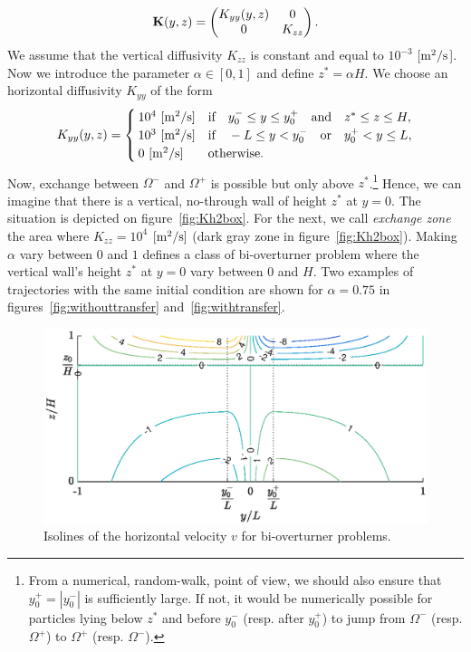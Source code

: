  \begin{equation}
 	\b K(y,z) = \begin{pmatrix} K_{yy}(y,z) & 0\\ 0 & K_{zz} \end{pmatrix}.  	
 \end{equation} 
We assume that the vertical diffusivity $K_{zz}$ is constant and equal to $10^{-3}$ [$\rm{m^2/s}$]. Now we introduce the parameter $\alpha \in [0,1]$ and define $z^* = \alpha H$. We choose an horizontal diffusivity $K_{yy}$ of the form
\begin{equation} \label{eq:Kh2box}
	K_{yy}(y,z) = \begin{cases}
			10^4\ \rm{[m^2/s]} & \mbox{if} \quad y_0^- \le y \le y_0^+ \quad \mbox{and} \quad z^* \le z \le H,\\
			10^3\ \rm{[m^2/s]} & \mbox{if} \quad -L \le y < y_0^- \quad \mbox{or} \quad y_0^+ < y \le L,\\
			0\ \rm{[m^2/s]}  & \mbox{otherwise}.
		\end{cases}
\end{equation}
Now, exchange between $\Omega^-$ and $\Omega^+$ is possible but only above $z^*$.\footnote{From a numerical, random-walk, point of view, we should also ensure that $y_0^+ = |y_0^-|$ is sufficiently large. If not, it would be numerically possible for particles lying below $z^*$ and before $y_0^-$ (resp. after $y_0^+$) to jump from $\Omega^-$ (resp. $\Omega^+$) to $\Omega^+$ (resp. $\Omega^-$).} Hence, we can imagine that there is a vertical, no-through wall of height $z^*$ at $y=0$. The situation is depicted on figure~\ref{fig:Kh2box}. For the next, we call \textit{exchange zone} the area where $K_{zz} = 10^4$ $\rm{[m^2/s]}$ (dark gray zone in figure~\ref{fig:Kh2box}). Making $\alpha$ vary between $0$ and $1$ defines a class of bi-overturner problem where the vertical wall's height $z^*$ at $y=0$ vary between $0$ and $H$. Two examples of trajectories with the same initial condition are shown for $\alpha = 0.75$ in figures~\ref{fig:withouttransfer} and~\ref{fig:withtransfer}.

\begin{figure}[!htp]
	\centering
	\includegraphics[width=\textwidth]{fig/problem2box/v2box_timmermans.eps}
	\caption{Isolines of the horizontal velocity $v$ for bi-overturner problems.}
	\label{fig:v2box}
\end{figure}

